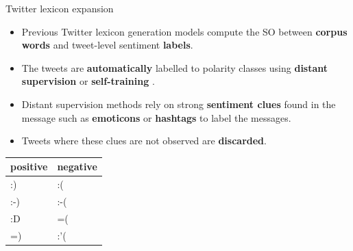 \documentclass[handout]{beamer}
\begin{document}
\begin{frame}{Twitter lexicon expansion}
\begin{scriptsize}
\begin{itemize}
\item Previous Twitter lexicon generation models compute the SO between \textbf{corpus words} and tweet-level sentiment \textbf{labels}. 
\item The tweets are \textbf{automatically} labelled to polarity classes using \textbf{distant supervision} \cite{Mohammad2013, Zhou2014} or \textbf{self-training} \cite{avaya2013}. 
\item  Distant supervision methods rely on strong \textbf{sentiment clues} found in the message such as \textbf{emoticons} \cite{Mohammad2013, Zhou2014} or \textbf{hashtags}  \cite{Mohammad2013} to label the messages.
\item  Tweets where these clues are not observed are \textbf{discarded}. 
\end{itemize}

\begin{table}[htbp]
\centering
\begin{tabular}{|l|l|}
\hline
positive & negative \\ \hline
:) & :( \\ 
:-) & :-( \\ 
:D & =( \\ 
=) & :'(   \\ \hline
\end{tabular}
\end{table} 


\end{scriptsize}
\end{frame}
\end{document}
